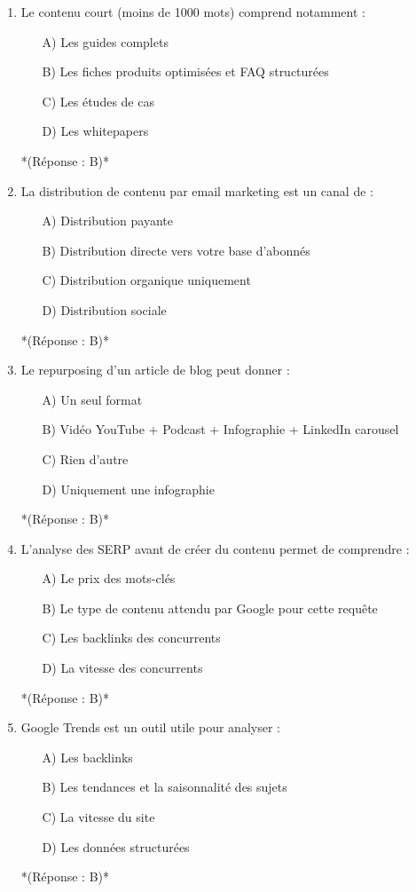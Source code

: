 \documentclass[12pt,a4paper,twoside]{report}
\begin{document}
\begin{enumerate}
\item Le contenu court (moins de 1000 mots) comprend notamment :
\begin{itemize}
\item[A)] Les guides complets
\item[B)] Les fiches produits optimisées et FAQ structurées
\item[C)] Les études de cas
\item[D)] Les whitepapers
\end{itemize}
*(Réponse : B)*

\item La distribution de contenu par email marketing est un canal de :
\begin{itemize}
\item[A)] Distribution payante
\item[B)] Distribution directe vers votre base d'abonnés
\item[C)] Distribution organique uniquement
\item[D)] Distribution sociale
\end{itemize}
*(Réponse : B)*

\item Le repurposing d'un article de blog peut donner :
\begin{itemize}
\item[A)] Un seul format
\item[B)] Vidéo YouTube + Podcast + Infographie + LinkedIn carousel
\item[C)] Rien d'autre
\item[D)] Uniquement une infographie
\end{itemize}
*(Réponse : B)*

\item L'analyse des SERP avant de créer du contenu permet de comprendre :
\begin{itemize}
\item[A)] Le prix des mots-clés
\item[B)] Le type de contenu attendu par Google pour cette requête
\item[C)] Les backlinks des concurrents
\item[D)] La vitesse des concurrents
\end{itemize}
*(Réponse : B)*

\item Google Trends est un outil utile pour analyser :
\begin{itemize}
\item[A)] Les backlinks
\item[B)] Les tendances et la saisonnalité des sujets
\item[C)] La vitesse du site
\item[D)] Les données structurées
\end{itemize}
*(Réponse : B)*


\end{enumerate}
\end{document}
